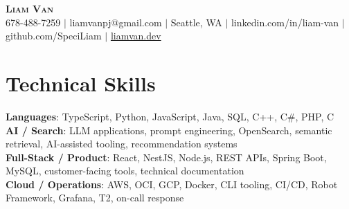 \documentclass[letterpaper,11pt]{article}
\begin{document}

%
\begin{center}
    \textbf{\Huge \scshape Liam Van} \\ \vspace{1pt}
    \small 678-488-7259 $|$ \small {liamvanpj@gmail.com} $|$ Seattle, WA
 {{$|$ linkedin.com/in/liam-van} {$|$ github.com/SpeciLiam} {$|$ \href{https://liamvan.dev}{liamvan.dev}}}

\end{center}

\section{Technical Skills}
 \begin{itemize}[leftmargin=0.15in, label={}]
    \small{\item{
     \textbf{Languages}{: TypeScript, Python, JavaScript, Java, SQL, C++, C\#, PHP, C} \\
     \textbf{AI / Search}{: LLM applications, prompt engineering, OpenSearch, semantic retrieval, AI-assisted tooling, recommendation systems} \\
     \textbf{Full-Stack / Product}{: React, NestJS, Node.js, REST APIs, Spring Boot, MySQL, customer-facing tools, technical documentation} \\
     \textbf{Cloud / Operations}{: AWS, OCI, GCP, Docker, CLI tooling, CI/CD, Robot Framework, Grafana, T2, on-call response} \\
    }}
 \end{itemize}
%
\end{document}
